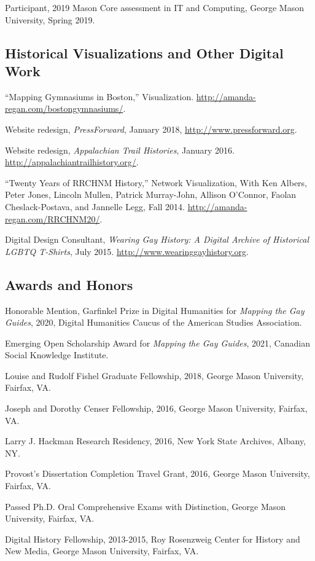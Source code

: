 \documentclass[11pt]{article}
\begin{document}
Participant, 2019 Mason Core assessment in IT and Computing, George Mason University, Spring 2019.

\subsection{Historical Visualizations and Other Digital Work}\label{other-digital-work}
``Mapping Gymnasiums in Boston,'' Visualization. \url{http://amanda-regan.com/bostongymnasiums/}.

Website redesign, \emph{PressForward}, January 2018, \url{http://www.pressforward.org}.

Website redesign, \emph{Appalachian Trail Histories}, January 2016. \url{http://appalachiantrailhistory.org/}.

``Twenty Years of RRCHNM History,'' Network Visualization, With Ken Albers, Peter Jones, Lincoln Mullen, Patrick Murray-John, Allison O’Connor, Faolan Cheslack-Postava, and Jannelle Legg, Fall 2014. \url{http://amanda-regan.com/RRCHNM20/}.

Digital Design Consultant, \emph{Wearing Gay History: A Digital Archive of Historical LGBTQ T-Shirts}, July 2015. \url{http://www.wearinggayhistory.org}.

\subsection{Awards and Honors}
Honorable Mention, Garfinkel Prize in Digital Humanities for \emph{Mapping the Gay Guides}, 2020, Digital Humanities Caucus of the American Studies Association.

Emerging Open Scholarship Award for \emph{Mapping the Gay Guides}, 2021, Canadian Social Knowledge Institute.

Louise and Rudolf Fishel Graduate Fellowship, 2018, George Mason University, Fairfax, VA.

Joseph and Dorothy Censer Fellowship, 2016, George Mason University, Fairfax, VA.

Larry J. Hackman Research Residency, 2016, New York State Archives, Albany, NY.

Provost's Dissertation Completion Travel Grant, 2016, George Mason University, Fairfax, VA.

Passed Ph.D. Oral Comprehensive Exams with Distinction, George Mason University, Fairfax, VA.

Digital History Fellowship, 2013-2015, Roy Rosenzweig Center for History and New Media, George Mason University, Fairfax, VA.
\end{document}
